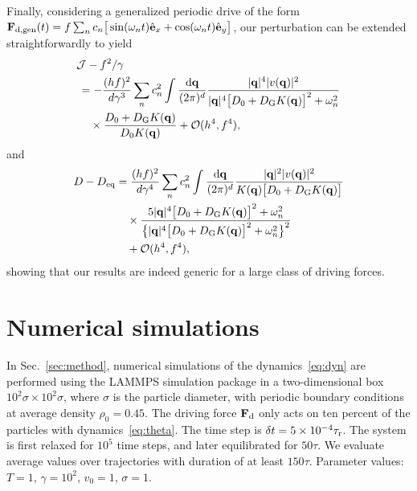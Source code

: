 \documentclass[pre, superscriptaddress, twocolumn,pre]{revtex4-1}
\begin{document}
Finally, considering a generalized periodic drive of the form ${\bf F}_{\rm d, gen}(t) = f \sum_n c_n\big[\sin(\omega_n t) \hat{\bf e}_x + \cos(\omega_n t)\hat{\bf e}_y \big]$, our perturbation can be extended straightforwardly to yield
\begin{equation}
	\begin{aligned}
		&{\cal J} - f^2/\gamma
		\\
		&\,= - \frac{(hf)^2}{d\gamma^3} \sum_n c_n^2 \int \frac{{\rm d}{\bf q}}{(2\pi)^d} \frac{|{\bf q}|^4 |v({\bf q})|^2}{|{\bf q}|^4\big[D_0+D_{\rm G}K({\bf q})\big]^2 + \omega_n^2}
		\\
		&\,\quad\times \frac{D_0+D_{\rm G}K({\bf q})}{D_0K({\bf q})} + {\cal O}(h^4,f^4) ,
		\\
	\end{aligned}
\end{equation}
and
\begin{equation}
	\begin{aligned}
		D - D_{\rm eq} &= \frac{(hf)^2}{d\gamma^4} \sum_n c_n^2 \int \frac{{\rm d}{\bf q}}{(2\pi)^d} \frac{|{\bf q}|^2|v({\bf q})|^2}{K({\bf q})\big[D_0+D_{\rm G}K({\bf q})\big]}
		\\
		&\quad\times \frac{5|{\bf q}|^4\big[D_0+D_{\rm G}K({\bf q})\big]^2 + \omega_n^2}{ \big\{ |{\bf q}|^4\big[D_0+D_{\rm G}K({\bf q})\big]^2 + \omega_n^2 \big\}^2}
		\\
		&\quad + {\cal O}(h^4,f^4) ,
	\end{aligned}
\end{equation}
showing that our results are indeed generic for a large class of driving forces.




\section{Numerical simulations}\label{app:simu}

In Sec.~\ref{sec:method}, numerical simulations of the dynamics~\eqref{eq:dyn} are performed using the LAMMPS simulation package in a two-dimensional box $10^2\sigma\times 10^2\sigma$, where $\sigma$ is the particle diameter, with periodic boundary conditions at average density $\rho_0=0.45$. The driving force ${\bf F}_{\rm d}$ only acts on ten percent of the particles with dynamics~\eqref{eq:theta}. The time step is $\delta t = 5\times 10^{-4} \tau_{\rm r}$. The system is first relaxed for $10^5$ time steps, and later equilibrated for $50\tau$. We evaluate average values over trajectories with duration of at least $150\tau$. Parameter values: $T=1$, $\gamma=10^2$, $v_0=1$, $\sigma=1$.
\end{document}
